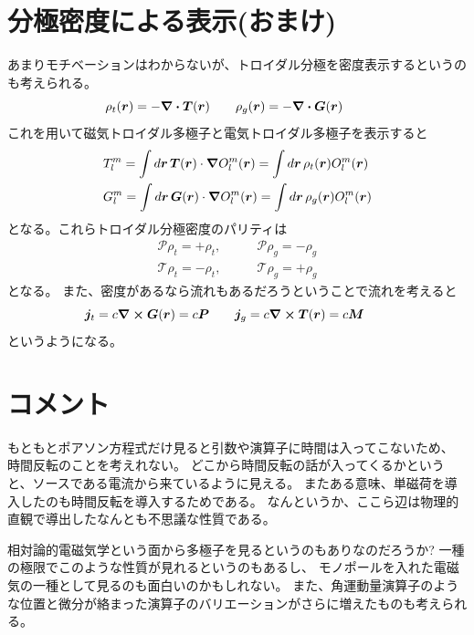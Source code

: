 \documentclass[../master.tex]{subfiles}
\begin{document}
\section{分極密度による表示(おまけ)}
あまりモチベーションはわからないが、トロイダル分極を密度表示するというのも考えられる。
\begin{equation}
    \rho_t(\vb*{r}) = -\div \vb*{T}(\vb*{r}) \qquad
    \rho_g(\vb*{r}) = -\div \vb*{G}(\vb*{r}) \qquad
\end{equation}
これを用いて磁気トロイダル多極子と電気トロイダル多極子を表示すると
\begin{align}
    &T_l^m
    = \int d\vb*{r}\, \vb*{T}(\vb*{r})\cdot \grad O_l^m(\vb*{r})
    = \int d\vb*{r}\, \rho_t(\vb*{r}) O_l^m(\vb*{r})\\
    &G_l^m
    = \int d\vb*{r}\, \vb*{G}(\vb*{r})\cdot \grad O_l^m(\vb*{r})
    = \int d\vb*{r}\, \rho_g(\vb*{r}) O_l^m(\vb*{r})
\end{align}
となる。これらトロイダル分極密度のパリティは
\begin{align}
    \mathcal{P} \rho_t = + \rho_t, \qquad&
    \mathcal{P} \rho_g = - \rho_g \\
    \mathcal{T} \rho_t = - \rho_t, \qquad&
    \mathcal{T} \rho_g = + \rho_g
\end{align}
となる。
また、密度があるなら流れもあるだろうということで流れを考えると
\begin{equation}
    \vb*{j}_t = c \curl \vb*{G} (\vb*{r}) = c \vb*{P} \qquad
    \vb*{j}_g = c \curl \vb*{T} (\vb*{r}) = c \vb*{M} \qquad
\end{equation}
というようになる。

\section{コメント}
もともとポアソン方程式だけ見ると引数や演算子に時間は入ってこないため、
時間反転のことを考えれない。
どこから時間反転の話が入ってくるかというと、ソースである電流から来ているように見える。
またある意味、単磁荷を導入したのも時間反転を導入するためである。
なんというか、ここら辺は物理的直観で導出したなんとも不思議な性質である。

相対論的電磁気学という面から多極子を見るというのもありなのだろうか?
一種の極限でこのような性質が見れるというのもあるし、
モノポールを入れた電磁気の一種として見るのも面白いのかもしれない。
また、角運動量演算子のような位置と微分が絡まった演算子のバリエーションがさらに増えたものも考えられる。
\end{document}
